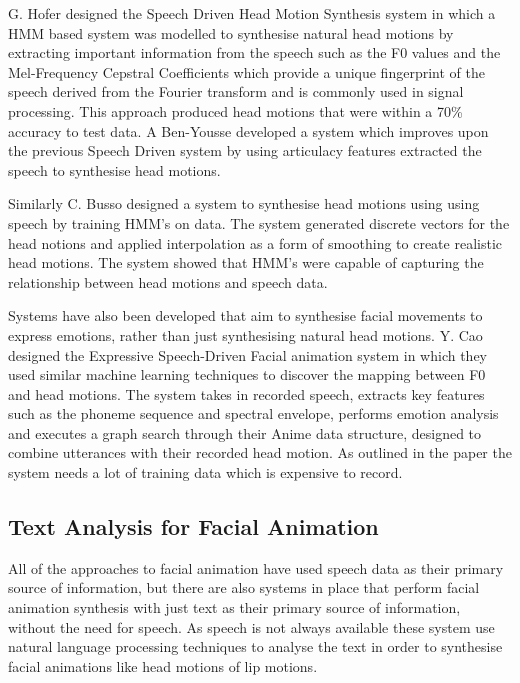 \documentclass[bsc,frontabs,twoside,singlespacing,parskip]{infthesis}
\begin{document}
G. Hofer designed the Speech Driven Head Motion Synthesis system \cite{speech_driven_head_motion} in which a HMM based system was modelled to synthesise natural head motions by extracting important information from the speech such as the F0 values and the Mel-Frequency Cepstral Coefficients which provide a unique fingerprint of the speech derived from the Fourier transform and is commonly used in signal processing. This approach produced head motions that were within a 70\% accuracy to test data. A Ben-Yousse developed a system which improves upon the previous Speech Driven system by using articulacy features extracted the speech\cite{artic1} to synthesise head motions.

Similarly C. Busso designed a system to synthesise head motions using using speech by training HMM's on data. \cite{busso_rigid} The system generated discrete vectors for the head notions and applied interpolation as a form of smoothing to create realistic head motions. The system showed that HMM's were capable of capturing the relationship between head motions and speech data.

Systems have also been developed that aim to synthesise facial movements to express emotions, rather than just synthesising natural head motions. Y. Cao designed the Expressive Speech-Driven Facial animation system  \cite{expressive_speech_animation} in which they used similar machine learning techniques to discover the mapping between F0 and head motions. The system takes in recorded speech, extracts key features such as the phoneme sequence and spectral envelope, performs emotion analysis and executes a graph search through their Anime data structure, designed to combine utterances with their recorded head motion. As outlined in the paper the system needs a lot of training data which is expensive to record. 

\subsection{Text Analysis for Facial Animation}

All of the approaches to facial animation have used speech data as their primary source of information, but there are also systems in place that perform facial animation synthesis with just text as their primary source of information, without the need for speech. As speech is not always available these system use natural language processing techniques to analyse the text in order to synthesise facial animations like head motions of lip motions.
\end{document}
